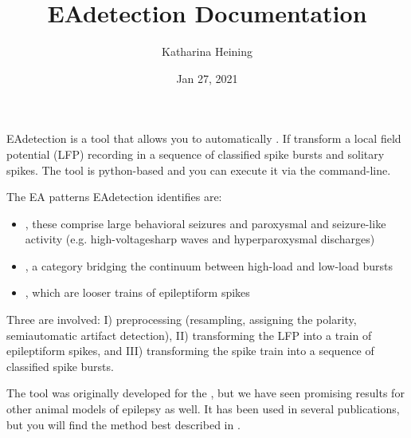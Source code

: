 \documentclass[letterpaper,10pt,english]{sphinxmanual}
\title{EAdetection Documentation}
\date{Jan 27, 2021}
\author{Katharina Heining}
\let\sphinxpxdimen\pdfpxdimen\else\newdimen\sphinxpxdimen
\begin{document}
\pagestyle{empty}
\maketitle
\pagestyle{plain}
\sphinxtableofcontents
\pagestyle{normal}
\label{\detokenize{index::doc}}


EAdetection is a tool that allows you to automatically .
If transform a local field potential (LFP) recording in a sequence of classified spike bursts and solitary spikes.
The tool is python-based and you can execute it via the command-line.

The EA patterns EAdetection identifies are:
\begin{itemize}
\item {} 
, these comprise large behavioral seizures and paroxysmal and seizure-like activity (e.g. high-voltagesharp waves and hyperparoxysmal discharges)

\item {} 
, a category bridging the continuum between high-load and low-load bursts

\item {} 
, which are looser trains of epileptiform spikes

\end{itemize}

Three  are involved: I) preprocessing (resampling, assigning the polarity,
semiautomatic artifact detection), II) transforming the LFP into a train of epileptiform spikes, and III)
transforming the spike train into a sequence of classified spike bursts.

\noindent{\hspace*{\fill}\sphinxincludegraphics[width=700\sphinxpxdimen]{{fig6_codeflow}.png}\hspace*{\fill}}

The tool was originally developed for the , but we have seen promising results for
other animal models of epilepsy as well. It has been used in several publications, but you will find the method best described
in .
\end{document}
